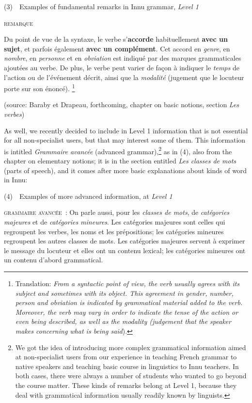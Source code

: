 \documentclass[letterpaper]{article}
\begin{document}
 (3)\ \ Examples of fundamental remarks in Innu grammar, \textit{Level 1}

\textsc{remarque}\textsc{ }

Du point de vue de la syntaxe, le verbe s{\textquoteright}\textbf{accorde} habituellement \textbf{avec un} \textbf{sujet}, et parfois \'egalement \textbf{avec un compl\'ement}. Cet accord en \textit{genre}, en \textit{nombre}, en \textit{personne} et en \textit{obviation} est indiqu\'e par des marques grammaticales ajout\'ees au verbe. De plus, le verbe peut varier de fa\c{c}on \`a indiquer le \textit{temps} de l{\textquoteright}action ou de l{\textquoteright}\'ev\'enement d\'ecrit, ainsi que la \textit{modalit\'e} (jugement que le locuteur porte sur son \'enonc\'e). \footnote{ Translation: \textit{From a syntactic point of view, the verb usually agrees with its subject and sometimes with its object. This agreement in gender, number, person and obviation is indicated by grammatical material added to the verb. Moreover, the verb may vary in order to indicate the tense of the action or even being described, as well as the modality (judgement that the speaker makes concerning what is being said}).}

(source: Baraby et Drapeau, forthcoming, chapter on basic notions, section \textit{Les verbes})

As well, we recently decided to include in Level 1 information that is not essential for all non-specialist users, but that may interest some of them. This information is intitled \textit{Grammaire avanc\'ee} (advanced grammar),\footnote{ We got the idea of introducing more complex grammatical information aimed at non-specialist users from our experience in teaching French grammar to native speakers and teaching basic course in linguistics to Innu teachers. In both cases, there were always a number of students who wanted to go beyond the course matter. These kinds of remarks belong at Level 1, because they deal with grammatical information usually readily known by linguists.} as in (4), also from the chapter on elementary notions; it is in the section entitled \textit{Les classes de mots} (parts of speech), and it comes after more basic explanations about kinds of word in Innu:

(4)\ \ Examples of more advanced information, at \textit{Level 1}

\textsc{grammaire avanc\'ee~}\textsc{: }On parle aussi, pour les \textit{classes de mots}, de \textit{cat\'egories majeures} et de \textit{cat\'egories mineures}. Les cat\'egories majeures sont celles qui regroupent les verbes, les noms et les pr\'epositions; les cat\'egories mineures regroupent les autres classes de mots. Les cat\'egories majeures servent \`a exprimer le message du locuteur et elles ont un contenu lexical; les cat\'egories mineures ont un contenu d{\textquoteright}abord grammatical.
\end{document}

